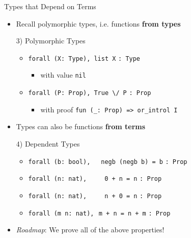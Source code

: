 \begin{frame}[fragile]{Types that Depend on Terms}
\begin{itemize}
  \item Recall polymorphic types, i.e. functions \textbf{from types}

  \begin{block}{3) Polymorphic Types}
    \begin{itemize}
      \item \lstinline|forall (X: Type), list X| \hfill \lstinline|: Type|
        \begin{itemize}
          \item with value \lstinline|nil|
        \end{itemize}
      \item \lstinline|forall (P: Prop), True \/|~\lstinline|P| \hfill \lstinline|: Prop|
        \begin{itemize}
          \item with proof \lstinline|fun (_: Prop) => or_introl I|
        \end{itemize}
    \end{itemize}
  \end{block}

  \pause

  \item Types can also be functions \textbf{from terms}

  \begin{block}{4) Dependent Types}
    \begin{itemize}
      \item \lstinline|forall (b: bool),|~~~\lstinline|negb (negb b) =|~\lstinline|b| \hfill \lstinline|: Prop|
      \item \lstinline|forall (n: nat),|~~~~~\lstinline|0 + n =|~\lstinline|n| \hfill \lstinline|: Prop|
      \item \lstinline|forall (n: nat),|~~~~~\lstinline|n + 0 =|~\lstinline|n| \hfill \lstinline|: Prop|
      \item \lstinline|forall (m n: nat),|\,~\lstinline|m + n =|~\lstinline|n + m| \hfill \lstinline|: Prop|
    \end{itemize}
  \end{block}

  \pause

  \item \textit{Roadmap}: We prove all of the above properties!
\end{itemize}
\end{frame}



